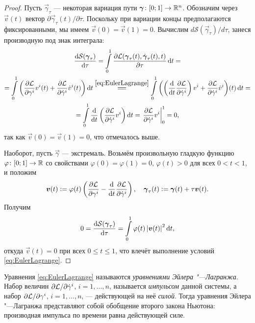 \begin{proof}
	Пусть $\vec{\gamma}_\tau$ --- некоторая вариация пути $\vec{\gamma}\colon [0; 1] \hm\to \R^n$. Обозначим через $\vec{v}(t)$ вектор $\partial\vec{\gamma}_\tau(t) / \partial\tau$. Поскольку при вариации концы предполагаются фиксированными, мы имеем $\vec{v}(0) = \vec{v}(1) = 0$. Вычислим $d\mathcal{S}(\vec{\gamma}_\tau) / d\tau$, занеся производную под знак интеграла:
	\begin{multline*}
		\frac{\d\mathcal{S}(\vec{\gamma}_\tau)}{\d\tau} = \int\limits_0^1\frac{\partial\L(\vec{\gamma}_\tau(t), \dot{\vec{\gamma}}_\tau(t), t)}{\partial\tau}\d t =\\ = \int\limits_0^1\br{\frac{\partial\L}{\partial\gamma^i}v^i(t) + \frac{\partial\L}{\partial\dot{\gamma}^i}\dot{v}^i(t)}\d t \stackrel{\eqref{eq:EulerLagrange}}{=\joinrel=} \int\limits_0^1\br{\br{\frac{\d}{\d t}\frac{\partial\L}{\partial\dot{\gamma}^i}}v^i + \frac{\partial\L}{\partial\dot{\gamma}^i}\dot{v}^i}\!(t)\d t =\\ = \int\limits_0^1\frac{\d}{\d t}\br{\frac{\partial\L}{\partial\dot{\gamma}^i}v^i}\d t = \left.\frac{\partial\L}{\partial\dot{\gamma}^i}v^i\right|_0^1 = 0,
	\end{multline*}
	так как $\vec{v}(0) = \vec{v}(1) = 0$, что отмечалось выше.

	Наоборот, пусть $\vec{\gamma}$ --- экстремаль. Возьмём произвольную гладкую функцию $\varphi\colon [0; 1] \to \mathbb{R}$ со свойствами $\varphi(0) = \varphi(1) = 0$, $\varphi(t) > 0$ для всех $0 < t < 1$, и положим
	\[
		\boldsymbol{v}(t) \vcentcolon = \varphi(t)\left(\frac{\partial\mathcal{L}}{\partial\gamma^i} - \frac{\mathop{}\!\mathrm{d}}{\mathop{}\!\mathrm{d} t}\frac{\partial\mathcal{L}}{\partial\dot{\gamma}^i}\right),\quad \boldsymbol{\gamma}_\tau(t) \vcentcolon = \boldsymbol{\gamma}(t) + \tau\boldsymbol{v}(t).
	\]
	Получим
	\[
		0 = \frac{\mathop{}\!\mathrm{d}\mathcal{S}(\boldsymbol{\gamma}_\tau)}{\mathop{}\!\mathrm{d}\tau} = \int\limits_0^1\varphi(t)\left\lvert\boldsymbol{v}(t)\right\rvert^2\mathop{}\!\mathrm{d} t,
	\]
	откуда $\vec{v}(t) = 0$ при всех $0 \leqslant t \leqslant 1$, что влечёт выполнение условий \eqref{eq:EulerLagrange}.
\end{proof}

Уравнения \eqref{eq:EulerLagrange} называются \textit{уравнениями Эйлера "---Лагранжа}. Набор величин $\partial\mathcal{L} / \partial\dot{\gamma}^i$, $i = 1, \ldots, n$, называется \textit{импульсом} данной системы, а набор $\partial\mathcal{L} / \partial\gamma^i$, $i = 1, \ldots, n$, --- действующей на неё \textit{силой}. Тогда уравнения Эйлера "---Лагранжа представляют собой обобщение второго закона Ньютона: производная импульса по времени равна действующей силе.

